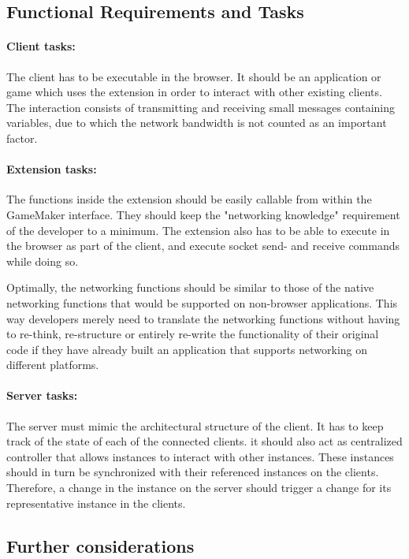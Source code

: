 \documentclass[bsc,frontabs,twoside,singlespacing,parskip,deptreport]{infthesis}     %
\begin{document}
\subsection{Functional Requirements and Tasks}
\paragraph*{Client tasks:}
The client has to be executable in the browser. It should be an application or game which uses the extension in order to interact with other existing clients. The interaction consists of transmitting and receiving small messages containing variables, due to which the network bandwidth is not counted as an important factor.

\paragraph*{Extension tasks:}
The functions inside the extension should be easily callable from within the GameMaker interface. They should keep the "networking knowledge" requirement of the developer to a minimum. The extension also has to be able to execute in the browser as part of the client, and execute socket send- and receive commands while doing so.

Optimally, the networking functions should be similar to those of the native networking functions that would be supported on non-browser applications. This way developers merely need to translate the networking functions without having to re-think, re-structure or entirely  re-write the functionality of their original code if they have already built an application that supports networking on different platforms.

\paragraph*{Server tasks:}
The server must mimic the architectural structure of the client. It has to keep track of the state of each of the connected clients. it should also act as centralized controller that allows instances to interact with other instances. These instances should in turn be synchronized with their referenced instances on the clients. Therefore, a change in the instance on the server should trigger a change for its representative instance in the clients.


\subsection{Further considerations}
\end{document}
